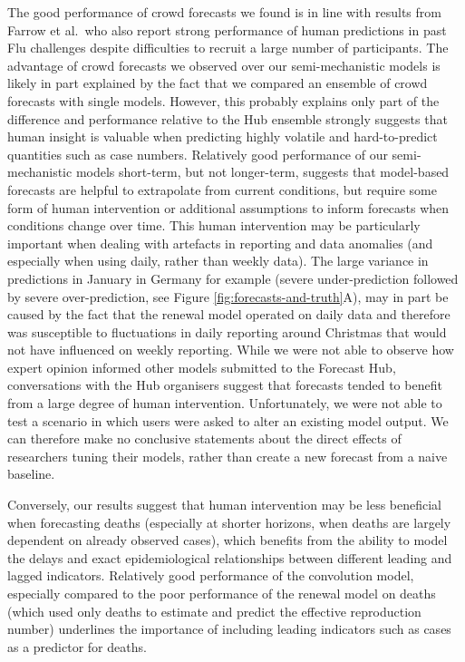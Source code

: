 \documentclass[
]{article}
\begin{document}
The good performance of crowd forecasts we found is in line with results from Farrow et al.~who also report strong performance of human predictions in past Flu challenges despite difficulties to recruit a large number of participants. The advantage of crowd forecasts we observed over our semi-mechanistic models is likely in part explained by the fact that we compared an ensemble of crowd forecasts with single models. However, this probably explains only part of the difference and performance relative to the Hub ensemble strongly suggests that human insight is valuable when predicting highly volatile and hard-to-predict quantities such as case numbers. Relatively good performance of our semi-mechanistic models short-term, but not longer-term, suggests that model-based forecasts are helpful to extrapolate from current conditions, but require some form of human intervention or additional assumptions to inform forecasts when conditions change over time. This human intervention may be particularly important when dealing with artefacts in reporting and data anomalies (and especially when using daily, rather than weekly data). The large variance in predictions in January in Germany for example (severe under-prediction followed by severe over-prediction, see Figure \ref{fig:forecasts-and-truth}A), may in part be caused by the fact that the renewal model operated on daily data and therefore was susceptible to fluctuations in daily reporting around Christmas that would not have influenced on weekly reporting. While we were not able to observe how expert opinion informed other models submitted to the Forecast Hub, conversations with the Hub organisers suggest that forecasts tended to benefit from a large degree of human intervention. Unfortunately, we were not able to test a scenario in which users were asked to alter an existing model output. We can therefore make no conclusive statements about the direct effects of researchers tuning their models, rather than create a new forecast from a naive baseline.

Conversely, our results suggest that human intervention may be less beneficial when forecasting deaths (especially at shorter horizons, when deaths are largely dependent on already observed cases), which benefits from the ability to model the delays and exact epidemiological relationships between different leading and lagged indicators. Relatively good performance of the convolution model, especially compared to the poor performance of the renewal model on deaths (which used only deaths to estimate and predict the effective reproduction number) underlines the importance of including leading indicators such as cases as a predictor for deaths.
\end{document}
